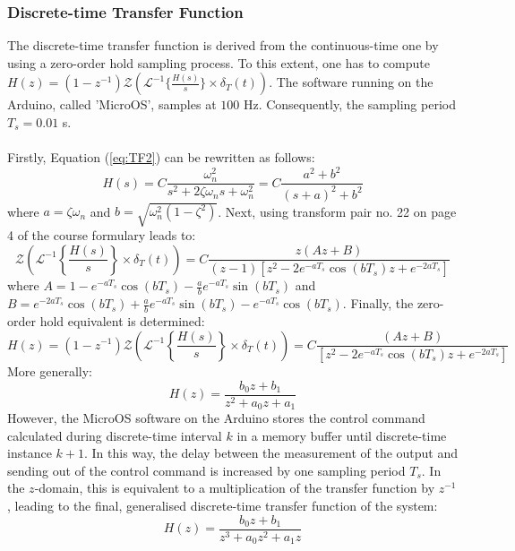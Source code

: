 \documentclass[a4paper,kul]{kulakarticle} %
\begin{document}
\subsubsection*{Discrete-time Transfer Function}

The discrete-time transfer function is derived from the continuous-time one by using a zero-order hold sampling process. To this extent, one has to compute $H(z) = (1-z^{-1}) \mathcal{Z} (\mathcal{L}^{-1}\{\frac{H(s)}{s}\} \times \delta_T(t))$. The software running on the Arduino, called 'MicroOS', samples at $100$ Hz. Consequently, the sampling period $T_s = 0.01$ s. 
\\\\
Firstly, Equation (\ref{eq:TF2}) can be rewritten as follows: 
\begin{equation}
	H(s) = C \frac{\omega_n^2}{s^2 + 2\zeta\omega_ns + \omega_n^2} = C \frac{a^2 + b^2}{(s+a)^2 + b^2}
\end{equation}
where $a = \zeta\omega_n$ and $b = \sqrt{\omega_n^2(1-\zeta^2)}$. Next, using transform pair no. 22 on page 4 of the course formulary leads to:
\begin{equation}
	\mathcal{Z} \left(\mathcal{L}^{-1}\left\{\frac{H(s)}{s}\right\} \times \delta_T(t)\right) = C \frac{z(Az+B)}{(z-1)\left[z^2-2e^{-aT_s}\cos(bT_s)z+e^{-2aT_s}\right]}
\end{equation}
where $A = 1-e^{-aT_s}\cos(bT_s) - \frac{a}{b}e^{-aT_s}\sin(bT_s)$ and $B = e^{-2aT_s}\cos(bT_s) + \frac{a}{b}e^{-aT_s}\sin(bT_s) - e^{-aT_s}\cos(bT_s)$. Finally, the zero-order hold equivalent is determined:
\begin{equation}
	H(z) = (1-z^{-1})\mathcal{Z} \left(\mathcal{L}^{-1}\left\{\frac{H(s)}{s}\right\} \times \delta_T(t)\right) = C \frac{(Az+B)}{\left[z^2-2e^{-aT_s}\cos(bT_s)z+e^{-2aT_s}\right]}
\end{equation}
More generally: 
\begin{equation}
	H(z) = \frac{b_0z + b_1}{z^2 + a_0 z + a_1}
\end{equation}
However, the MicroOS software on the Arduino stores the control command calculated during discrete-time interval $k$ in a memory buffer until discrete-time instance $k+1$. In this way, the delay between the measurement of the output and sending out of the control command is increased by one sampling period $T_s$. In the $z$-domain, this is equivalent to a multiplication of the transfer function by $z^{-1}$, leading to the final, generalised discrete-time transfer function of the system:
\begin{equation}
	\label{eq:TF3}
	H(z) = \frac{b_0z + b_1}{z^3 + a_0 z^2 + a_1 z}
\end{equation}
\end{document}
